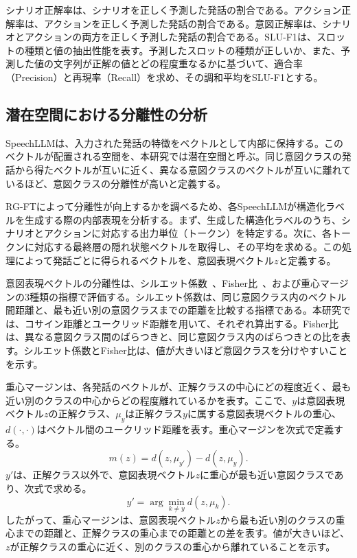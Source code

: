 \documentclass[11pt,a4paper]{ltjsarticle}
\begin{document}
シナリオ正解率は、シナリオを正しく予測した発話の割合である。アクション正解率は、アクションを正しく予測した発話の割合である。意図正解率は、シナリオとアクションの両方を正しく予測した発話の割合である。SLU-F1は、スロットの種類と値の抽出性能を表す。予測したスロットの種類が正しいか、また、予測した値の文字列が正解の値とどの程度重なるかに基づいて、適合率（Precision）と再現率（Recall）を求め、その調和平均をSLU-F1とする。

\subsection{潜在空間における分離性の分析}
SpeechLLMは、入力された発話の特徴をベクトルとして内部に保持する。このベクトルが配置される空間を、本研究では潜在空間と呼ぶ。同じ意図クラスの発話から得たベクトルが互いに近く、異なる意図クラスのベクトルが互いに離れているほど、意図クラスの分離性が高いと定義する。

RG-FTによって分離性が向上するかを調べるため、各SpeechLLMが構造化ラベルを生成する際の内部表現を分析する。まず、生成した構造化ラベルのうち、シナリオとアクションに対応する出力単位（トークン）を特定する。次に、各トークンに対応する最終層の隠れ状態ベクトルを取得し、その平均を求める。この処理によって発話ごとに得られるベクトルを、意図表現ベクトル$z$と定義する。

意図表現ベクトルの分離性は、シルエット係数~\cite{ROUSSEEUW198753}、Fisher比~\cite{fisher1936use}、および重心マージンの3種類の指標で評価する。シルエット係数は、同じ意図クラス内のベクトル間距離と、最も近い別の意図クラスまでの距離を比較する指標である。本研究では、コサイン距離とユークリッド距離を用いて、それぞれ算出する。Fisher比は、異なる意図クラス間のばらつきと、同じ意図クラス内のばらつきとの比を表す。シルエット係数とFisher比は、値が大きいほど意図クラスを分けやすいことを示す。

重心マージンは、各発話のベクトルが、正解クラスの中心にどの程度近く、最も近い別のクラスの中心からどの程度離れているかを表す。ここで、$y$は意図表現ベクトル$z$の正解クラス、$\mu_y$は正解クラス$y$に属する意図表現ベクトルの重心、$d(\cdot,\cdot)$はベクトル間のユークリッド距離を表す。重心マージンを次式で定義する。
\begin{equation}
m(z)=d(z,\mu_{y'})-d(z,\mu_y).
\tag{10}
\end{equation}
$y'$は、正解クラス以外で、意図表現ベクトル$z$に重心が最も近い意図クラスであり、次式で求める。
\begin{equation}
y'=\arg\min_{k\ne y}d(z,\mu_k).
\tag{11}
\end{equation}
したがって、重心マージンは、意図表現ベクトル$z$から最も近い別のクラスの重心までの距離と、正解クラスの重心までの距離との差を表す。値が大きいほど、$z$が正解クラスの重心に近く、別のクラスの重心から離れていることを示す。
\end{document}
